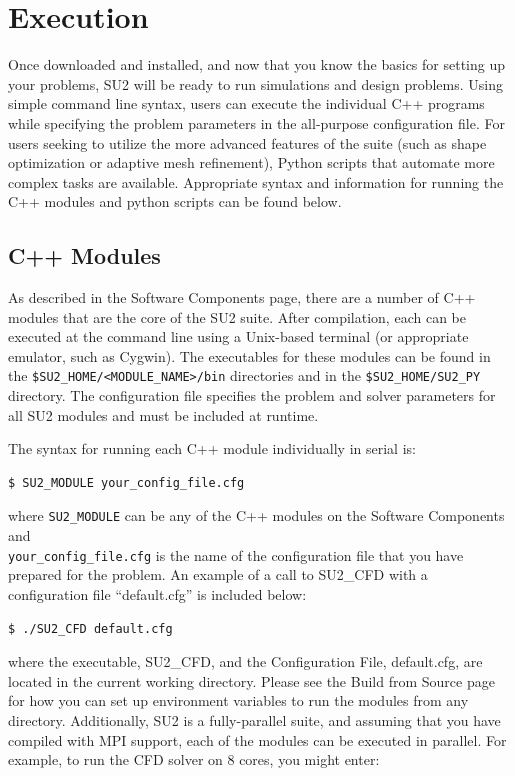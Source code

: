 \documentclass[12pt, a4paper, twoside]{article}
\begin{document}
   


\newpage
\section{Execution}
Once downloaded and installed, and now that you know the basics for setting up your problems, SU2 will be ready to run simulations and design problems. Using simple command line syntax, users can execute the individual C++ programs while specifying the problem parameters in the all-purpose configuration file. For users seeking to utilize the more advanced features of the suite (such as shape optimization or adaptive mesh refinement), Python scripts that automate more complex tasks are available. Appropriate syntax and information for running the C++ modules and python scripts can be found below.

\subsection{C++ Modules}
As described in the Software Components page, there are a number of C++ modules that are the core of the SU2 suite. After compilation, each can be executed at the command line using a Unix-based terminal (or appropriate emulator, such as Cygwin). The executables for these modules can be found in the \verb|$SU2_HOME/<MODULE_NAME>/bin| directories and in the \verb|$SU2_HOME/SU2_PY| directory. The configuration file specifies the problem and solver parameters for all SU2 modules and must be included at runtime.

The syntax for running each C++ module individually in serial is:

\begin{lstlisting}
$ SU2_MODULE your_config_file.cfg
\end{lstlisting}


where \verb|SU2_MODULE| can be any of the C++ modules on the Software Components and \\ \verb|your_config_file.cfg| is the name of the configuration file that you have prepared for the problem. An example of a call to SU2\_CFD with a configuration file “default.cfg” is included below:

\begin{lstlisting}
$ ./SU2_CFD default.cfg
\end{lstlisting}


where the executable, SU2\_CFD, and the Configuration File, default.cfg, are located in the current working directory. Please see the Build from Source page for how you can set up environment variables to run the modules from any directory. Additionally, SU2 is a fully-parallel suite, and assuming that you have compiled with MPI support, each of the modules can be executed in parallel. For example, to run the CFD solver on 8 cores, you might enter:
\end{document}
